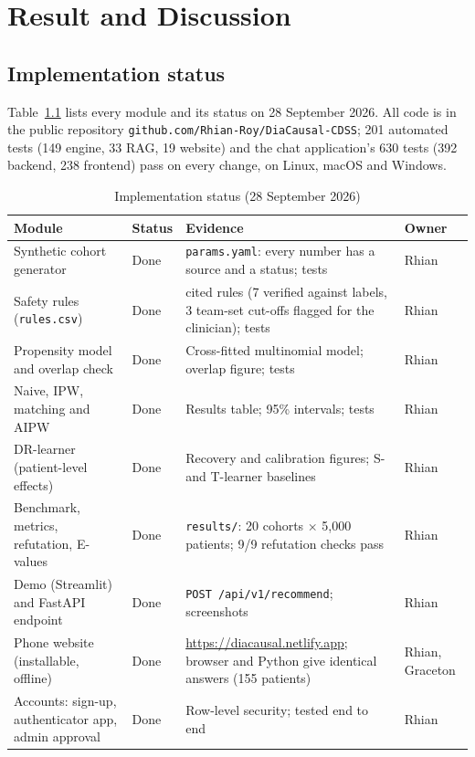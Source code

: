 \chapter{Result and Discussion}\label{chap5}
\newpage
\section{Implementation status}
Table~\ref{tab:status} lists every module and its status on 28 September 2026. All code is in the public repository \texttt{github.com/Rhian-Roy/DiaCausal-CDSS}; 201 automated tests (149 engine, 33 RAG, 19 website) and the chat application's 630 tests (392 backend, 238 frontend) pass on every change, on Linux, macOS and Windows.
\begin{longtable}{>{\raggedright\arraybackslash}p{4.1cm}>{\raggedright\arraybackslash}p{2.2cm}>{\raggedright\arraybackslash}p{6.2cm}>{\raggedright\arraybackslash}p{1.6cm}}
\caption{Implementation status (28 September 2026)}\label{tab:status}\\\toprule
Module & Status & Evidence & Owner\\\midrule\endhead
Synthetic cohort generator & Done & \texttt{params.yaml}: every number has a source and a status; tests & Rhian\\
Safety rules (\texttt{rules.csv}) & Done & 10 cited rules (7 verified against labels, 3 team-set cut-offs flagged for the clinician); tests & Rhian\\
Propensity model and overlap check & Done & Cross-fitted multinomial model; overlap figure; tests & Rhian\\
Naive, IPW, matching and AIPW & Done & Results table; 95\% intervals; tests & Rhian\\
DR-learner (patient-level effects) & Done & Recovery and calibration figures; S- and T-learner baselines & Rhian\\
Benchmark, metrics, refutation, E-values & Done & \texttt{results/}: 20 cohorts $\times$ 5{,}000 patients; 9/9 refutation checks pass & Rhian\\
Demo (Streamlit) and FastAPI endpoint & Done & \texttt{POST /api/v1/recommend}; screenshots & Rhian\\
Phone website (installable, offline) & Done & \url{https://diacausal.netlify.app}; browser and Python give identical answers (155 patients) & Rhian, Graceton\\
Accounts: sign-up, authenticator app, admin approval & Done & Row-level security; tested end to end & Rhian\\

\end{longtable}
